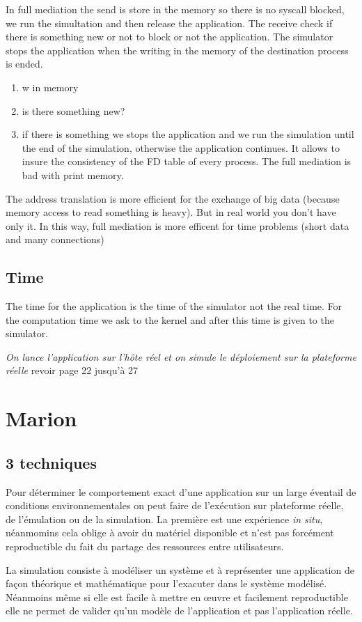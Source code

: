 \documentclass{article}
\begin{document}
In full mediation the send is store in the memory so there is no syscall
blocked, we run the simultation and then release the application. The receive
check if there is something new or not to block or not the application. The
simulator stops the application when the writing in the memory of the
destination process is ended.
\begin{enumerate}
\item w in memory
\item is there something new?
\item if there is something we stops the application and we run the simulation
  until the end of the simulation, otherwise the application continues.  It
  allows to insure the consistency of the FD table of every process. The full
  mediation is bad with print memory.
\end{enumerate}

The address translation is more efficient for the exchange of big data (because
memory access to read something is heavy). But in real world you don't have only
it. In this way, full mediation is more efficent for time problems (short data
and many connections)

\subsection{Time}
The time for the application is the time of the simulator not the real time. For
the computation time we ask to the kernel and after this time is given to the
simulator.

\textit{On lance l'application sur l'hôte réel et on simule le déploiement sur
  la plateforme réelle} {\color{red} revoir page 22 jusqu'à 27}

\section{Marion}
\subsection{3 techniques}
Pour déterminer le comportement exact d'une application sur un large éventail de
conditions environnementales on peut faire de l'exécution sur plateforme réelle,
de l'émulation ou de la simulation. La première est une expérience \textit{in
  situ}, néanmomins cela oblige à avoir du matériel disponible et n'est pas
forcément reproductible du fait du partage des ressources entre utilisateurs.

La simulation consiste à modéliser un système et à représenter une application
de façon théorique et mathématique pour l'exacuter dans le système
modélisé. Néanmoins même si elle est facile à mettre en \oe uvre et facilement
reproductible elle ne permet de valider qu'un modèle de l'application et pas
l'application réelle.
\end{document}
